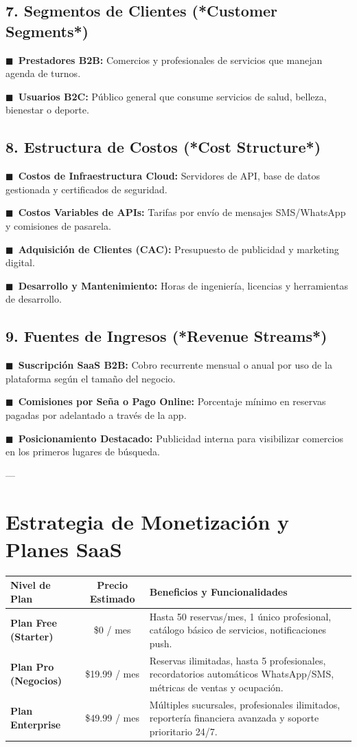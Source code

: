 \documentclass[11pt,a4paper]{article}
\newcommand{\bulletBlue}{\textcolor{primaryBlue}{\footnotesize$\blacksquare$}\ }
\newcommand{\destacado}[2]{\noindent\bulletBlue\textbf{#1:} #2\par\vspace{3pt}}
\begin{document}
\subsection{7. Segmentos de Clientes (*Customer Segments*)}
\destacado{Prestadores B2B}{Comercios y profesionales de servicios que manejan agenda de turnos.}
\destacado{Usuarios B2C}{Público general que consume servicios de salud, belleza, bienestar o deporte.}

\subsection{8. Estructura de Costos (*Cost Structure*)}
\destacado{Costos de Infraestructura Cloud}{Servidores de API, base de datos gestionada y certificados de seguridad.}
\destacado{Costos Variables de APIs}{Tarifas por envío de mensajes SMS/WhatsApp y comisiones de pasarela.}
\destacado{Adquisición de Clientes (CAC)}{Presupuesto de publicidad y marketing digital.}
\destacado{Desarrollo y Mantenimiento}{Horas de ingeniería, licencias y herramientas de desarrollo.}

\subsection{9. Fuentes de Ingresos (*Revenue Streams*)}
\destacado{Suscripción SaaS B2B}{Cobro recurrente mensual o anual por uso de la plataforma según el tamaño del negocio.}
\destacado{Comisiones por Seña o Pago Online}{Porcentaje mínimo en reservas pagadas por adelantado a través de la app.}
\destacado{Posicionamiento Destacado}{Publicidad interna para visibilizar comercios en los primeros lugares de búsqueda.}

---

\section{Estrategia de Monetización y Planes SaaS}

\begin{center}
\begin{tabularx}{\textwidth}{|l|c|X|}
\hline
\rowcolor{primaryDark}
\textbf{\color{white}Nivel de Plan} & \textbf{\color{white}Precio Estimado} & \textbf{\color{white}Beneficios y Funcionalidades} \\
\hline
\textbf{Plan Free (Starter)} & \$0 / mes & 
Hasta 50 reservas/mes, 1 único profesional, catálogo básico de servicios, notificaciones push. \\
\hline
\textbf{Plan Pro (Negocios)} & \$19.99 / mes & 
Reservas ilimitadas, hasta 5 profesionales, recordatorios automáticos WhatsApp/SMS, métricas de ventas y ocupación. \\
\hline
\textbf{Plan Enterprise} & \$49.99 / mes & 
Múltiples sucursales, profesionales ilimitados, reportería financiera avanzada y soporte prioritario 24/7. \\
\hline
\end{tabularx}
\end{center}
\end{document}
